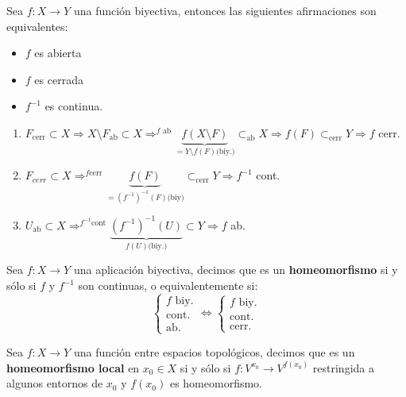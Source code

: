 \begin{prop}
Sea $f:X\rightarrow Y$ una función biyectiva, entonces las siguientes afirmaciones son equivalentes:
\begin{itemize}
    \item $f$ es abierta
    \item $f$ es cerrada
    \item $f^{-1}$ es continua.
\end{itemize}
\end{prop}
\begin{demo}
\begin{enumerate}
    \item $F_{\text{cerr}} \subset X \Rightarrow X\setminus F_{\text{ab}} \subset X \Rightarrow^{ f\text{ ab}} \underbrace{f\left( X\setminus F \right)}_{= Y\setminus f\left( F \right) \text{(biy.)}} \subset_{\text{ab}} X \Rightarrow f\left( F \right) \subset_{\text{cerr}} Y \Rightarrow f$ cerr.

    \item $F_{cerr} \subset X \Rightarrow^{f \text{cerr}} \underbrace{f\left( F \right)}_{= \left( f^{-1} \right)^{-1} \left( F \right) \text{(biy)}} \subset_{\text{cerr}} Y \Rightarrow f^{-1}$ cont.

    \item $U_{\text{ab}} \subset X \Rightarrow^{f^{-1} \text{cont}} \underbrace{\left( f^{-1} \right) ^{-1} \left( U \right) }_{f\left( U \right) \text{(biy.)}} \subset Y \Rightarrow f$ ab.
\end{enumerate}
\end{demo}

\begin{defi}[Homeomorfismo]
Sea $f: X \rightarrow Y$ una aplicación biyectiva, decimos que es un \textbf{homeomorfismo} si y sólo si $f$ y $f^{-1}$ son continuas, o equivalentemente si:
    \[
    \begin{cases}
        f \text{ biy.}\\
        \text{cont.}\\
        \text{ab.} 
    \end{cases} \Leftrightarrow \begin{cases}
        f \text{ biy.}\\
        \text{cont.}\\
        \text{cerr.}
    \end{cases} 
    \]
\end{defi}

\begin{defi}
Sea $f: X \rightarrow Y$ una función entre espacios topológicos, decimos que es un \textbf{homeomorfismo local} en $x_0 \in X$ si y sólo si $f: V^{x_0} \rightarrow V^{f\left( x_0 \right)}$ restringida a algunos entornos de $x_0$ y $f\left( x_0 \right)$ es homeomorfismo.
\end{defi}

